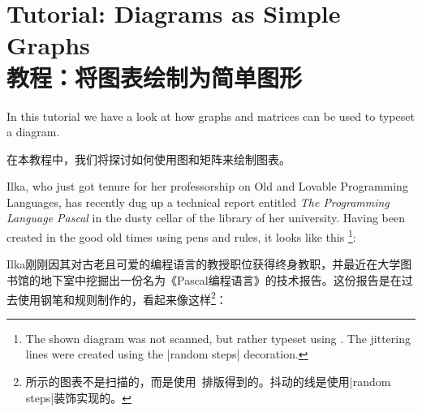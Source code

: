 %
%
%


\section{Tutorial: Diagrams as Simple Graphs\\教程：将图表绘制为简单图形}

In this tutorial we have a look at how graphs and matrices can be used to
typeset a diagram.

在本教程中，我们将探讨如何使用图和矩阵来绘制图表。

Ilka, who just got tenure for her professorship on Old and Lovable Programming
Languages, has recently dug up a technical report entitled \emph{The
Programming Language Pascal} in the dusty cellar of the library of her
university. Having been created in the good old times using pens and rules, it
looks like this%
\footnote{The shown diagram was not scanned, but rather typeset using
\tikzname. The jittering lines were created using the |random steps|
decoration.}:


Ilka刚刚因其对古老且可爱的编程语言的教授职位获得终身教职，并最近在大学图书馆的地下室中挖掘出一份名为《Pascal编程语言》的技术报告。这份报告是在过去使用钢笔和规则制作的，看起来像这样\footnote{所示的图表不是扫描的，而是使用\tikzname\ 排版得到的。抖动的线是使用|random steps|装饰实现的。}：


